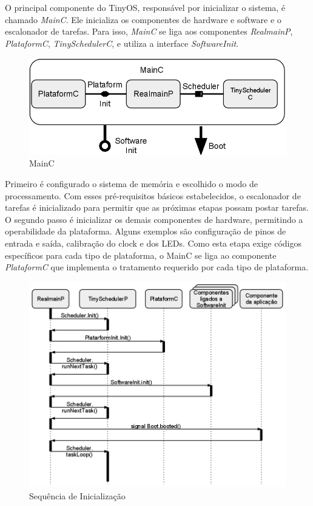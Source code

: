 O principal componente do TinyOS, responsável por inicializar o sistema, é chamado \textit{MainC}. 
Ele inicializa os componentes de hardware e software e o escalonador de tarefas. Para isso, \textit{MainC} se liga aos
componentes \textit{RealmainP}, \textit{PlataformC}, \textit{TinySchedulerC}, e utiliza a interface \textit{SoftwareInit}.

\begin{figure}[htb]
\centering
\includegraphics[scale=0.4]{images/mainc.png}
\caption{MainC}
\end{figure}

Primeiro é configurado o sistema de memória e escolhido o modo de processamento. 
Com esses pré-requisitos básicos estabelecidos,  o escalonador de tarefas é inicializado 
para permitir que as próximas etapas possam postar tarefas.
O segundo passo é inicializar os demais componentes de hardware, permitindo a operabilidade da plataforma.
Alguns exemplos são configuração de pinos de entrada e saída, calibração do clock e dos LEDs.
Como esta etapa exige códigos específicos para cada tipo de plataforma, o MainC se liga ao componente
\textit{PlataformC} que implementa o tratamento requerido por cada tipo de plataforma.

\begin{figure}[htb]
\centering
\includegraphics[scale=0.45]{images/sequencia-de-inicializacao.png}
\caption{Sequência de Inicialização}
\end{figure}

